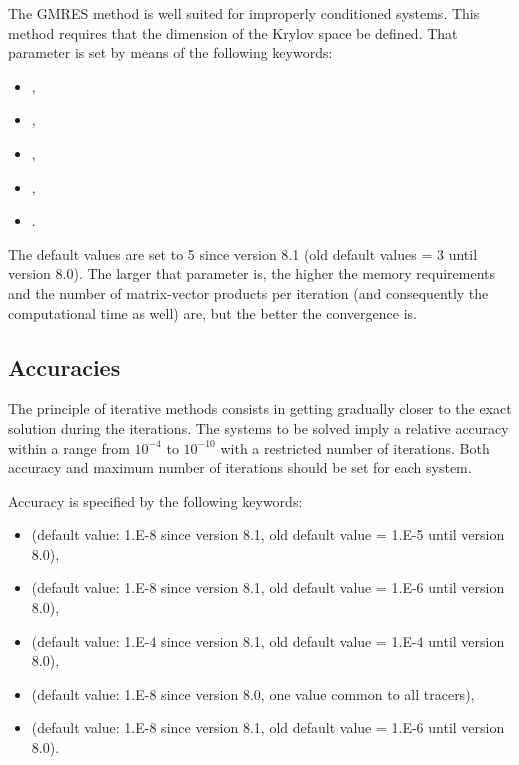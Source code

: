 The GMRES method is well suited for improperly conditioned systems. This method
requires that the dimension of the Krylov space be defined. That parameter is
set by means of the following keywords:

\begin{itemize}
\item {},

\item {},

\item {},

\item {},

\item {}.
\end{itemize}

The default values are set to 5 since version 8.1 (old default values
= 3 until version 8.0). The larger that parameter is, the higher the
memory requirements and the number of matrix-vector products per iteration (and
consequently the computational time as well) are, but the better the
convergence is.

\subsection{Accuracies}
\label{sec:accuracy}
The principle of iterative methods consists in getting gradually closer to the
exact solution during the iterations. The systems to be solved imply a relative
accuracy within a range from $10^{-4}$ to $10^{-10}$ with a restricted
number of iterations. Both accuracy and maximum number of iterations should be
set for each system.

Accuracy is specified by the following keywords:

\begin{itemize}
\item {} (default value: 1.E-8
  since version 8.1, old default value = 1.E-5 until version 8.0),

\item {} (default value: 1.E-8
  since version 8.1, old default value = 1.E-6 until version 8.0),

\item {} (default value: 1.E-4
  since version 8.1, old default value = 1.E-4 until version 8.0),

%
\item {} (default value: 1.E-8
since version 8.0, one value common to all tracers),

\item {} (default value: 1.E-8
  since version 8.1, old default value = 1.E-6 until version 8.0).
\end{itemize}

